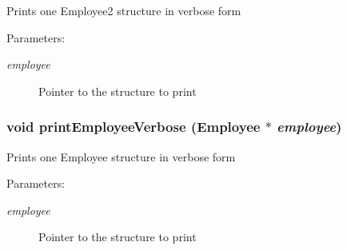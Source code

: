 Prints one Employee2 structure in verbose form \begin{Desc}
\item[Parameters:]
\begin{description}
\item[{\em employee}]Pointer to the structure to print \end{description}
\end{Desc}
\subsubsection{\setlength{\rightskip}{0pt plus 5cm}void print\-Employee\-Verbose (\bf{Employee} $\ast$ {\em employee})}\label{employee_8c_4d9da5be2623d2f7814ac0345dbe1733}


Prints one Employee structure in verbose form \begin{Desc}
\item[Parameters:]
\begin{description}
\item[{\em employee}]Pointer to the structure to print \end{description}
\end{Desc}
